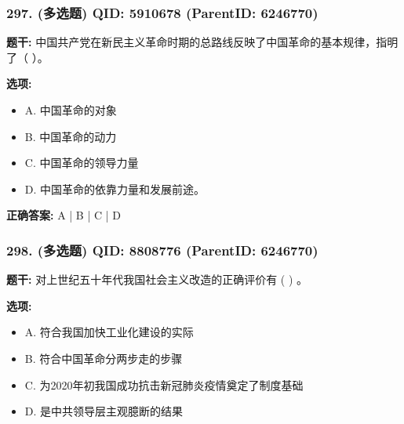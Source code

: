\documentclass[12pt,UTF8]{ctexart}
\begin{document}
\vspace{0.3em}\hrulefill\vspace{0.7em}

\subsubsection*{297. (多选题) \small QID: 5910678 (ParentID: 6246770)}

\textbf{题干:}
中国共产党在新民主义革命时期的总路线反映了中国革命的基本规律，指明了（ ）。



\textbf{选项:}
\begin{itemize}[leftmargin=*]

  \item A. 中国革命的对象

  \item B. 中国革命的动力

  \item C. 中国革命的领导力量

  \item D. 中国革命的依靠力量和发展前途。

\end{itemize}

\textbf{正确答案:}
A | B | C | D

\vspace{0.3em}\hrulefill\vspace{0.7em}

\subsubsection*{298. (多选题) \small QID: 8808776 (ParentID: 6246770)}

\textbf{题干:}
对上世纪五十年代我国社会主义改造的正确评价有 ( ) 。



\textbf{选项:}
\begin{itemize}[leftmargin=*]

  \item A. 符合我国加快工业化建设的实际

  \item B. 符合中国革命分两步走的步骤

  \item C. 为2020年初我国成功抗击新冠肺炎疫情奠定了制度基础

  \item D. 是中共领导层主观臆断的结果

\end{itemize}
\end{document}
